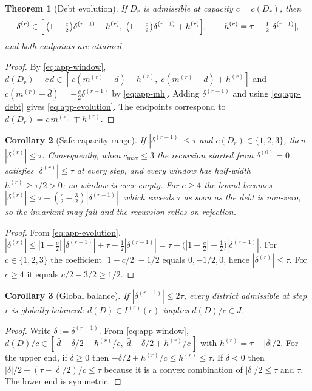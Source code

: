\documentclass[preprint,12pt,authoryear]{elsarticle}
\newtheorem{theorem}{Theorem}[section]
\newtheorem{corollary}[theorem]{Corollary}
\theoremstyle{definition}
\begin{document}
\begin{theorem}[Debt evolution]\label{thm:app-evolution}\label{thm:debt-evol}\label{thm:correctness}
If $D_r$ is admissible at capacity $c=c(D_r)$, then
\begin{equation}\label{eq:app-evolution}
  \delta^{(r)}\in\Bigl[\,\bigl(1-\tfrac{c}{2}\bigr)\delta^{(r-1)}-h^{(r)},\;
                       \bigl(1-\tfrac{c}{2}\bigr)\delta^{(r-1)}+h^{(r)}\Bigr],
  \qquad h^{(r)}=\tau-\tfrac12|\delta^{(r-1)}|,
\end{equation}
and both endpoints are attained.
\end{theorem}
\begin{proof}
By \eqref{eq:app-window}, $d(D_r)-c\,\bar d\in
[\,c(m^{(r)}-\bar d)-h^{(r)},\;c(m^{(r)}-\bar d)+h^{(r)}]$ and
$c(m^{(r)}-\bar d)=-\tfrac{c}{2}\delta^{(r-1)}$ by \eqref{eq:app-mh}. Adding $\delta^{(r-1)}$ and using \eqref{eq:app-debt} gives \eqref{eq:app-evolution}. The endpoints correspond to $d(D_r)=c\,m^{(r)}\mp h^{(r)}$.
\end{proof}

\begin{corollary}[Safe capacity range]\label{cor:app-invariant}\label{cor:envelope}
If $|\delta^{(r-1)}|\le\tau$ and $c(D_r)\in\{1,2,3\}$, then
$|\delta^{(r)}|\le\tau$. Consequently, when $c_{\max}\le 3$ the recursion
started from $\delta^{(0)}=0$ satisfies $|\delta^{(r)}|\le\tau$ at every
step, and every window has half-width $h^{(r)}\ge\tau/2>0$: no window is
ever empty. For $c\ge 4$ the bound becomes $|\delta^{(r)}|\le\tau+(\tfrac{c}{2}-\tfrac32)|\delta^{(r-1)}|$, which exceeds $\tau$ as soon as the debt is non-zero, so the invariant may fail and the recursion relies on rejection.
\end{corollary}
\begin{proof}
From \eqref{eq:app-evolution},
$|\delta^{(r)}|\le|1-\tfrac{c}{2}|\,|\delta^{(r-1)}|+\tau-\tfrac12|\delta^{(r-1)}|
 =\tau+\bigl(|1-\tfrac{c}{2}|-\tfrac12\bigr)|\delta^{(r-1)}|$. For
$c\in\{1,2,3\}$ the coefficient $|1-c/2|-1/2$ equals $0,-1/2,0$, hence
$|\delta^{(r)}|\le\tau$. For $c\ge4$ it equals $c/2-3/2\ge 1/2$.
\end{proof}

\begin{corollary}[Global balance]\label{cor:app-containment}
If $|\delta^{(r-1)}|\le 2\tau$, every district admissible at step $r$ is
globally balanced: $d(D)\in I^{(r)}(c)$ implies $d(D)/c\in J$.
\end{corollary}
\begin{proof}
Write $\delta:=\delta^{(r-1)}$. From \eqref{eq:app-window},
$d(D)/c\in[\,\bar d-\delta/2-h^{(r)}/c,\;\bar d-\delta/2+h^{(r)}/c\,]$ with
$h^{(r)}=\tau-|\delta|/2$. For the upper end, if $\delta\ge0$ then
$-\delta/2+h^{(r)}/c\le h^{(r)}\le\tau$. If $\delta<0$ then
$|\delta|/2+(\tau-|\delta|/2)/c\le\tau$ because it is a convex combination of
$|\delta|/2\le\tau$ and $\tau$. The lower end is symmetric.
\end{proof}
\end{document}
